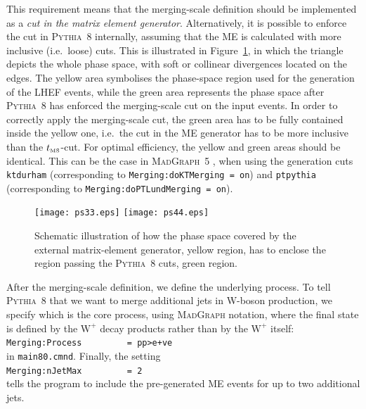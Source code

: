 \documentclass[12pt,a4paper]{article}
\newcommand{\W}{{\mathrm W}}
\newcommand{\tms}{\ensuremath{t_{\textnormal{\tiny MS}}}}
\begin{document}
This requirement means that the merging-scale definition should be 
implemented as a \emph{cut in the matrix element generator}. 
Alternatively, it is possible to enforce the cut in \textsc{Pythia}~8 
internally, assuming that the ME is calculated with more inclusive 
(i.e.\ loose) cuts. This is illustrated in Figure~\ref{fig:pythia-tms-cut}, 
in which the triangle depicts the whole phase space, with soft or 
collinear divergences located on the edges. The yellow area symbolises 
the phase-space region used for the generation of the LHEF events, 
while the green area represents the phase space after \textsc{Pythia}~8 
has enforced the merging-scale cut on the input events. In order to 
correctly apply the merging-scale cut, the green area has to be fully 
contained inside the yellow one, i.e.\ the cut in the ME generator has 
to be more inclusive than the $\tms$-cut. For optimal efficiency, the 
yellow and green areas should be identical. This can be the case in 
\textsc{MadGraph}~5 \cite{madgraphfive}, when using the generation cuts 
\texttt{ktdurham} (corresponding to \texttt{Merging:doKTMerging = on}) 
and \texttt{ptpythia} (corresponding to 
\texttt{Merging:doPTLundMerging = on}).

\begin{figure}
\centering
\texttt{[image: ps33.eps]}
\texttt{[image: ps44.eps]}
\caption{Schematic illustration of how the phase space covered by the 
external matrix-element generator, yellow region, has to enclose the 
region passing the \textsc{Pythia}~8 cuts, green region.
\label{fig:pythia-tms-cut}}
\end{figure}

After the merging-scale definition, we define the underlying process.
To tell \textsc{Pythia}~8 that we want to merge additional jets
in W-boson production, we specify which is the core process, using
\textsc{MadGraph} notation, where the final state is defined by the 
$\W^+$ decay products rather than by the $\W^+$ itself:\\
\hspace*{10mm}\texttt{Merging:Process~~~~~~~~~= pp>e+ve}\\
in \texttt{main80.cmnd}. Finally, the setting\\
\hspace*{10mm}\texttt{Merging:nJetMax~~~~~~~~~= 2}\\
tells the program to include the pre-generated ME events for up to two 
additional jets.
\end{document}

